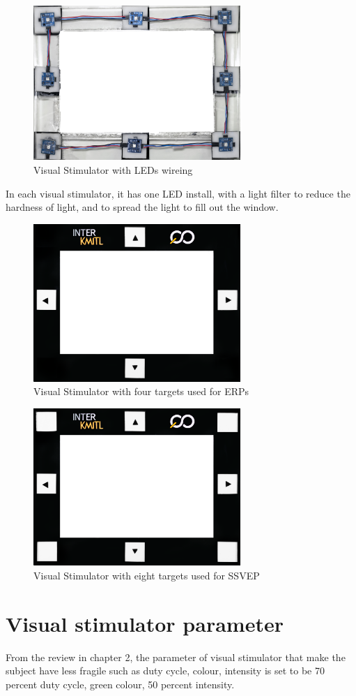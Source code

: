 \begin{figure}[ht]
	\centering
	\includegraphics[width=0.7\textwidth]{chapter6/frame_LED.jpg}
	\caption{Visual Stimulator with LEDs wireing}
\end{figure}
In each visual stimulator, it has one LED install, with a light filter to reduce the hardness of light, and to spread the light to fill out the window.
\begin{figure}[ht]
	\centering
	\includegraphics[width=0.7\textwidth]{chapter7/frame_4.jpg}
	\caption{Visual Stimulator with four targets used for ERPs}
\end{figure}

\begin{figure}[ht]
	\centering
	\includegraphics[width=0.7\textwidth]{chapter7/frame_8.jpg}
	\caption{Visual Stimulator with eight targets used for SSVEP}
\end{figure}

\section{Visual stimulator parameter}
\hspace{1.5cm}From the review in chapter 2, the parameter of visual stimulator that make the subject have less fragile such as duty cycle, colour, intensity is set to be 70 percent duty cycle, green colour, 50 percent intensity. 